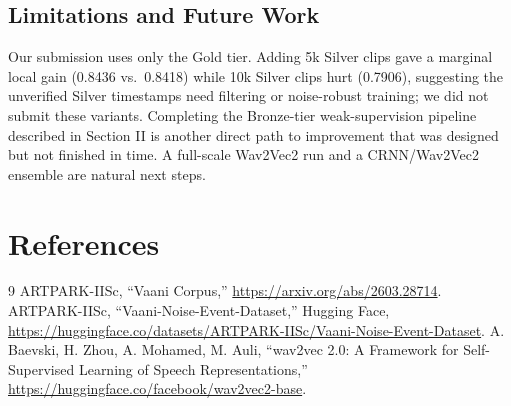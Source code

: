 \documentclass[conference]{IEEEtran}
\begin{document}
\subsection{Limitations and Future Work}
Our submission uses only the Gold tier. Adding 5k Silver clips gave a marginal
local gain (0.8436 vs.\ 0.8418) while 10k Silver clips hurt (0.7906),
suggesting the unverified Silver timestamps need filtering or noise-robust
training; we did not submit these variants. Completing the Bronze-tier
weak-supervision pipeline described in Section II is another direct path to
improvement that was designed but not finished in time. A full-scale
Wav2Vec2 run and a CRNN/Wav2Vec2 ensemble are natural next steps.

\section*{References}
\begin{thebibliography}{9}
 ARTPARK-IISc, ``Vaani Corpus,'' \url{https://arxiv.org/abs/2603.28714}.
 ARTPARK-IISc, ``Vaani-Noise-Event-Dataset,'' Hugging Face,
\url{https://huggingface.co/datasets/ARTPARK-IISc/Vaani-Noise-Event-Dataset}.
 A. Baevski, H. Zhou, A. Mohamed, M. Auli, ``wav2vec 2.0:
A Framework for Self-Supervised Learning of Speech Representations,''
\url{https://huggingface.co/facebook/wav2vec2-base}.
\end{thebibliography}
\end{document}
